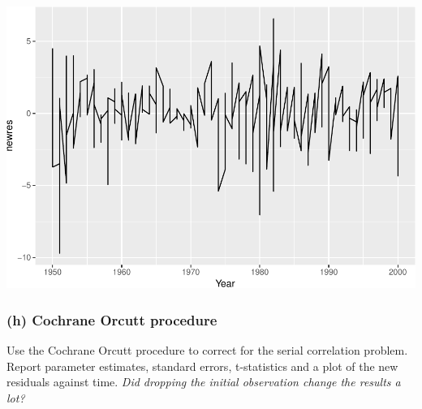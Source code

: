 \documentclass[11pt,]{article}
\newenvironment{Shaded}{\begin{snugshade}}{\end{snugshade}}
\newcommand{\KeywordTok}[1]{\textcolor[rgb]{0.13,0.29,0.53}{\textbf{#1}}}
\newcommand{\DataTypeTok}[1]{\textcolor[rgb]{0.13,0.29,0.53}{#1}}
\newcommand{\StringTok}[1]{\textcolor[rgb]{0.31,0.60,0.02}{#1}}
\newcommand{\CommentTok}[1]{\textcolor[rgb]{0.56,0.35,0.01}{\textit{#1}}}
\newcommand{\OperatorTok}[1]{\textcolor[rgb]{0.81,0.36,0.00}{\textbf{#1}}}
\newcommand{\NormalTok}[1]{#1}
\begin{document}
\begin{Shaded}
\end{Shaded}

\includegraphics{ps4_code_files/figure-latex/plot PW results-1.pdf}

\subsubsection{(h) Cochrane Orcutt
procedure}\label{h-cochrane-orcutt-procedure}

Use the Cochrane Orcutt procedure to correct for the serial correlation
problem. Report parameter estimates, standard errors, t-statistics and a
plot of the new residuals against time. \emph{Did dropping the initial
observation change the results a lot?}
\end{document}

